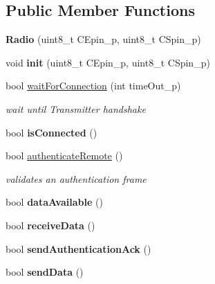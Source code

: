 \subsection*{Public Member Functions}
\begin{DoxyCompactItemize}
\item 
\mbox{\label{class_radio_a0775d3e885563f797abf893bd7dab722}} 
{\bfseries Radio} (uint8\+\_\+t C\+Epin\+\_\+p, uint8\+\_\+t C\+Spin\+\_\+p)
\item 
\mbox{\label{class_radio_a0824b3e73e1285a98b818a40e30eb784}} 
void {\bfseries init} (uint8\+\_\+t C\+Epin\+\_\+p, uint8\+\_\+t C\+Spin\+\_\+p)
\item 
bool \hyperlink{class_radio_acb313b8c4ccfbe9eed993d566e563f89}{wait\+For\+Connection} (int time\+Out\+\_\+p)
\begin{DoxyCompactList}\small\item\em wait until Transmitter handshake \end{DoxyCompactList}\item 
\mbox{\label{class_radio_a531aebd77214bc665027819db617a81d}} 
bool {\bfseries is\+Connected} ()
\item 
bool \hyperlink{class_radio_a50a86b8fbc5cd906c721d54406f98b9b}{authenticate\+Remote} ()
\begin{DoxyCompactList}\small\item\em validates an authentication frame \end{DoxyCompactList}\item 
\mbox{\label{class_radio_a85f5d3b2851f7787337c410f8608a45a}} 
bool {\bfseries data\+Available} ()
\item 
\mbox{\label{class_radio_af5f2ff2feaa025d251f6ec3682fb6477}} 
bool {\bfseries receive\+Data} ()
\item 
\mbox{\label{class_radio_a470a9f109780600f2e3ff815ff85f2f5}} 
bool {\bfseries send\+Authentication\+Ack} ()
\item 
\mbox{\label{class_radio_a666fdbfbf97b5cdd91e8a07fa9cd3fed}} 
bool {\bfseries send\+Data} ()
\item 
\mbox{\label{class_radio_a269cbab3a0ae4e0d4e514f7ce83fe4fb}} 

\end{DoxyCompactItemize}
